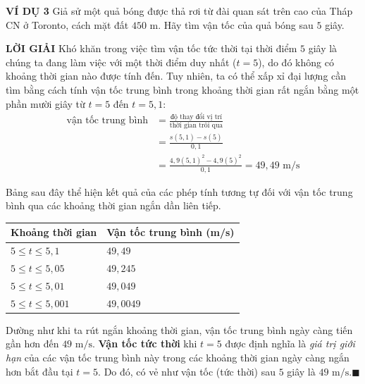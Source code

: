 \begin{minipage}[t]{0.70\textwidth}
  \vspace{0pt}%
  {\textbf{\textsf{\color{stewartcyan}VÍ DỤ 3}}}\quad
  Giả sử một quả bóng được thả rơi từ đài quan sát trên cao của Tháp CN ở Toronto, cách mặt đất $450\text{ m}$. Hãy tìm vận tốc của quả bóng sau $5$ giây.

  \vspace{2pt}
  {\textbf{\textsf{\color{stewartcyan}LỜI GIẢI}}}\quad
  Khó khăn trong việc tìm vận tốc tức thời tại thời điểm $5$ giây là chúng ta đang làm việc với một thời điểm duy nhất ($t = 5$), do đó không có khoảng thời gian nào được tính đến. Tuy nhiên, ta có thể xấp xỉ đại lượng cần tìm bằng cách tính vận tốc trung bình trong khoảng thời gian rất ngắn bằng một phần mười giây từ $t = 5$ đến $t = 5{,}1$:
  \begin{align*}
    \text{vận tốc trung bình} &= \frac{\text{độ thay đổi vị trí}}{\text{thời gian trôi qua}} \\[6pt]
    &= \frac{s(5{,}1) - s(5)}{0{,}1} \\[6pt]
    &= \frac{4{,}9(5{,}1)^2 - 4{,}9(5)^2}{0{,}1} = 49{,}49\text{ m/s}
  \end{align*}

  Bảng sau đây thể hiện kết quả của các phép tính tương tự đối với vận tốc trung bình qua các khoảng thời gian ngắn dần liên tiếp.

  \vspace{2pt}
  \begin{center}
    \renewcommand{\arraystretch}{1.25}
    \fontsize{9pt}{11pt}\selectfont
    \begin{tabular}{|>{\centering\arraybackslash}m{3.2cm}|>{\centering\arraybackslash}m{3.8cm}|}
      \hline
      \rowcolor{tableheader}
      \textsf{Khoảng thời gian} & \textsf{Vận tốc trung bình (m/s)} \\
      \hline
      $5 \leqslant t \leqslant 5{,}1$   & $49{,}49$ \\
      $5 \leqslant t \leqslant 5{,}05$  & $49{,}245$ \\
      $5 \leqslant t \leqslant 5{,}01$  & $49{,}049$ \\
      $5 \leqslant t \leqslant 5{,}001$ & $49{,}0049$ \\
      \hline
    \end{tabular}
  \end{center}
  \vspace{2pt}

  Dường như khi ta rút ngắn khoảng thời gian, vận tốc trung bình ngày càng tiến gần hơn đến $49\text{ m/s}$. \textbf{Vận tốc tức thời} khi $t = 5$ được định nghĩa là \textit{giá trị giới hạn} của các vận tốc trung bình này trong các khoảng thời gian ngày càng ngắn hơn bắt đầu tại $t = 5$. Do đó, có vẻ như vận tốc (tức thời) sau $5$ giây là $49\text{ m/s}$.\hfill{\color{stewartcyan}$\blacksquare$}


\end{minipage}
